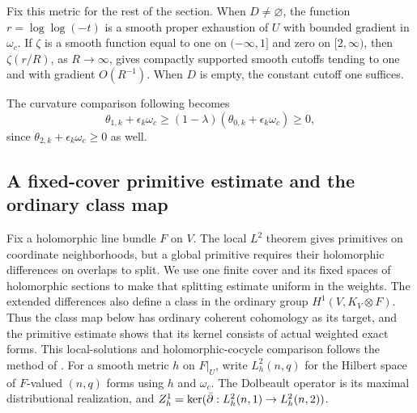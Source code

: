 Fix this metric for the rest of the section. When $D\ne\varnothing$,
the function $r=\log\log(-t)$ is a smooth proper exhaustion of $U$
with bounded gradient in $\omega_c$. If $\zeta$ is a smooth function
equal to one on $(-\infty,1]$ and zero on $[2,\infty)$, then
$\zeta(r/R)$, as $R\to\infty$, gives compactly supported smooth
cutoffs tending to one and with gradient $O(R^{-1})$. When $D$ is
empty, the constant cutoff one suffices.

The curvature comparison
following  becomes
\begin{equation}\label{eq:curvature-interior-comparison}
 \theta_{1,k}+\epsilon_k\omega_c
 \ge(1-\lambda)(\theta_{0,k}+\epsilon_k\omega_c)\ge0,
\end{equation}
since $\theta_{2,k}+\epsilon_k\omega_c\ge0$ as well.

\subsection{A fixed-cover primitive estimate and the ordinary class map}

Fix a holomorphic line bundle $F$ on $V$. The local $L^2$ theorem
gives primitives on coordinate neighborhoods,
but a global primitive requires their holomorphic differences on
overlaps to split. We use one finite cover and its fixed spaces of
holomorphic sections to make that splitting estimate uniform in the
weights. The extended differences also define a class in the ordinary
group $H^1(V,K_V\otimes F)$. Thus the class map below has ordinary
coherent cohomology as its target, and the primitive estimate shows
that its kernel consists of actual weighted exact forms.
This local-solutions and holomorphic-cocycle comparison follows the
method of \cite[Section~3, Claim~1 and Lemma~3.2]{FujinoInjectivity2012}.
For a smooth metric $h$ on
$F|_U$, write $L^2_h(n,q)$ for the Hilbert space of $F$-valued
$(n,q)$ forms using $h$ and $\omega_c$.  The Dolbeault operator is its
maximal distributional realization, and
$Z^1_h=\ker(\bar\partial:L^2_h(n,1)\to L^2_h(n,2))$.


